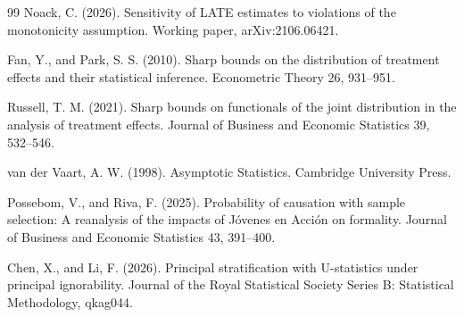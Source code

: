 \documentclass{article}
\begin{document}
\begin{thebibliography}{99}
   Noack, C. (2026). Sensitivity of LATE estimates to violations of the monotonicity assumption. Working paper, arXiv:2106.06421.

   Fan, Y., and Park, S. S. (2010). Sharp bounds on the distribution of treatment effects and their statistical inference. Econometric Theory 26, 931--951.

   Russell, T. M. (2021). Sharp bounds on functionals of the joint distribution in the analysis of treatment effects. Journal of Business and Economic Statistics 39, 532--546.

   van der Vaart, A. W. (1998). Asymptotic Statistics. Cambridge University Press.

   Possebom, V., and Riva, F. (2025). Probability of causation with sample selection: A reanalysis of the impacts of Jóvenes en Acción on formality. Journal of Business and Economic Statistics 43, 391--400.

   Chen, X., and Li, F. (2026). Principal stratification with U-statistics under principal ignorability. Journal of the Royal Statistical Society Series B: Statistical Methodology, qkag044.

\end{thebibliography}
\end{document}
